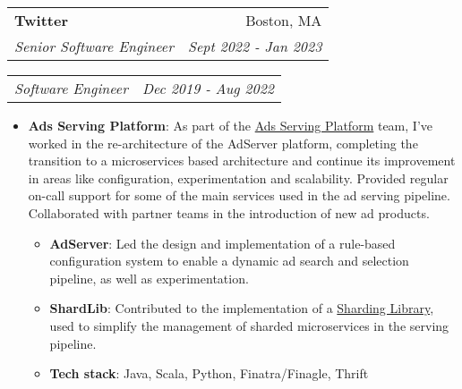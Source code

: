 \documentclass[letterpaper,11pt]{article}
\makeatletter
\newcommand{\resumeItem}[2]{
  \item\small{
    \textbf{#1}{: #2 \vspace{-2pt}}
  }
}
\newcommand{\resumeSubheading}[4]{
  \vspace{-1pt}\item
    \begin{tabular*}{0.97\textwidth}[t]{l@{\extracolsep{\fill}}r}
      \textbf{#1} & #2 \\
      \textit{\small#3} & \textit{\small #4} \\
    \end{tabular*}\vspace{-5pt}
}
\newcommand{\resumeSubSubheading}[2]{
    \begin{tabular*}{0.97\textwidth}{l@{\extracolsep{\fill}}r}
      \textit{\small#1} & \textit{\small #2} \\
    \end{tabular*}\vspace{-5pt}
}
\newcommand{\resumeSubItem}[2]{\resumeItem{#1}{#2}\vspace{-1pt}}
\newcommand{\resumeSubHeadingListStart}{\begin{itemize}[leftmargin=*]}
\newcommand{\resumeSubHeadingListEnd}{\end{itemize}\vspace{5pt}}
\newcommand{\resumeItemListStart}{\begin{itemize}}
\newcommand{\resumeItemListEnd}{\end{itemize}\vspace{-5pt}}
\def \ASP{https://blog.twitter.com/engineering/en_us/topics/infrastructure/2020/building-twitters-ad-platform-architecture-for-the-future}
\def \ShardLib{https://blog.twitter.com/engineering/en_us/topics/infrastructure/2021/sharding-simplification-and-twitters-ads-serving-platform}
\makeatother
\begin{document}
    \resumeSubheading
      {Twitter}{Boston, MA}
      {Senior Software Engineer}{Sept 2022 - Jan 2023}
    \resumeSubSubheading
      {Software Engineer}{Dec 2019 - Aug 2022}
      \resumeItemListStart
        \resumeItem{Ads Serving Platform}
          {As part of the \href{\ASP}{Ads Serving Platform} team, I've worked in the re-architecture of the AdServer platform,
          completing the transition to a microservices based architecture and continue its improvement
          in areas like configuration, experimentation and scalability. Provided regular on-call support for some of the main services used in the ad 
          serving pipeline. Collaborated with partner teams in the introduction of new ad products.}
        \resumeSubHeadingListStart
          \resumeSubItem{AdServer}{Led the design and implementation of a rule-based configuration
          system to enable a dynamic ad search and selection pipeline, as well as experimentation.}
          \resumeSubItem{ShardLib}{Contributed to the implementation of a \href{\ShardLib}{Sharding Library},
          used to simplify the management of sharded microservices in the serving pipeline.}
          \resumeSubItem{Tech stack} {Java, Scala, Python, Finatra/Finagle, Thrift}
        \resumeSubHeadingListEnd
      \resumeItemListEnd
      
\end{document}
